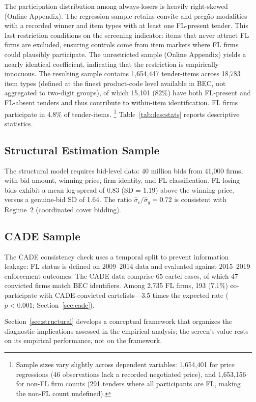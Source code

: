 The participation distribution among always-losers is heavily
right-skewed (Online Appendix).
The regression sample retains convite and preg\~ao modalities with a
recorded winner and item types with at least one FL-present tender.
This last restriction conditions on the screening indicator: items
that never attract FL firms are excluded, ensuring controls come from item
markets where FL firms could plausibly participate. The unrestricted
sample (Online Appendix) yields a nearly
identical coefficient, indicating that the restriction is empirically
innocuous.
The resulting sample contains 1,654,447 tender-items across 18,783
item types (defined at the finest product-code level available in BEC,
not aggregated to two-digit groups), of which 15,101 (82\%) have both
FL-present and FL-absent tenders and thus contribute to within-item
identification. FL firms participate in 4.8\% of tender-items.%
\footnote{Sample sizes vary slightly across dependent variables:
1,654,401 for price regressions (46 observations lack a recorded
negotiated price), and 1,653,156 for non-FL firm counts (291 tenders
where all participants are FL, making the non-FL count undefined).}
Table~\ref{tab:descstats} reports descriptive statistics.



\subsection{Structural Estimation Sample}
\label{sec:structural_sample}

The structural model requires bid-level data: 40 million bids from
41,000 firms, with bid amount, winning price, firm identity, and FL
classification. FL losing bids exhibit a mean log-spread of 0.83
(SD = 1.19) above the winning price, versus a genuine-bid SD of 1.64.
The ratio $\hat{\sigma}_c / \hat{\sigma}_g = 0.72$ is consistent with Regime~2
(coordinated cover bidding).

\subsection{CADE Sample}
\label{sec:cade_sample}

The CADE consistency check uses a temporal split to prevent information
leakage: FL status is defined on 2009--2014 data and evaluated against
2015--2019 enforcement outcomes. The CADE data comprise 65 cartel
cases, of which 47 convicted firms match BEC identifiers. Among 2,735
FL firms, 193 (7.1\%) co-participate with CADE-convicted
cartelists---3.5 times the expected rate ($p < 0.001$;
Section~\ref{sec:cade}).

Section~\ref{sec:structural} develops a conceptual framework that
organizes the diagnostic implications assessed in the empirical
analysis; the screen's value rests on its empirical performance, not
on the framework.
